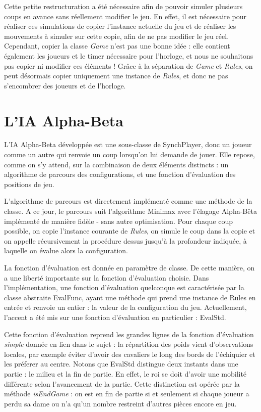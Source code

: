 \documentclass[11pt]{article}
\begin{document}
\-

Cette petite restructuration a été nécessaire afin de pouvoir simuler plusieurs coups en avance sans réellement modifier le jeu.
En effet, il est nécessaire pour réaliser ces simulations de copier l'instance actuelle du jeu et de réaliser les mouvements à simuler sur cette copie, afin de ne pas modifier le jeu réel. Cependant, copier la classe \textit{Game} n'est pas une bonne idée :
elle contient également les joueurs et le timer nécessaire pour l'horloge, et nous ne souhaitons pas copier ni modifier ces éléments !
Grâce à la séparation de \textit{Game} et \textit{Rules}, on peut désormais copier uniquement une instance de \textit{Rules}, et donc ne pas s'encombrer des joueurs et de l'horloge.

\section{L'IA Alpha-Beta}

L'IA Alpha-Beta développée est une sous-classe de SynchPlayer, donc un joueur comme un autre qui renvoie un coup lorsqu'on lui demande de jouer. Elle repose, comme on s'y attend, sur la combinaison de deux éléments distincts : un algorithme de parcours des configurations, et une fonction d'évaluation des positions de jeu.

\-

L'algorithme de parcours est directement implémenté comme une méthode de la classe. A ce jour, le parcours suit l'algorithme Minimax avec l'élagage Alpha-Bêta implémenté de manière fidèle - sans autre optimisation. Pour chaque coup possible, on copie l'instance courante de \textit{Rules}, on simule le coup dans la copie et on appelle récursivement la procédure dessus jusqu'à la profondeur indiquée, à laquelle on évalue alors la configuration.

\-

La fonction d'évaluation est donnée en paramètre de classe. De cette manière, on a une liberté importante sur la fonction d'évaluation choisie. Dans l'implémentation, une fonction d'évaluation quelconque est caractérisée par la classe abstraite EvalFunc, ayant une méthode qui prend une instance de Rules en entrée et renvoie un entier : la valeur de la configuration du jeu. Actuellement, l'accent a été mis sur une fonction d'évaluation en particulier : EvalStd.

\-

Cette fonction d'évaluation reprend les grandes lignes de la fonction d'évaluation \textit{simple} donnée en lien dans le sujet : la répartition des poids vient d'observations locales, par exemple éviter d'avoir des cavaliers le long des bords de l'échiquier et les préferer au centre. Notons que EvalStd distingue deux instants dans une partie : le milieu et la fin de partie. En effet, le roi se doit d'avoir une mobilité différente selon l'avancement de la partie. Cette distinction est opérée par la méthode \textit{isEndGame} : on est en fin de partie si et seulement si chaque joueur a perdu sa dame ou n'a qu'un nombre restreint d'autres pièces encore en jeu.
\end{document}
